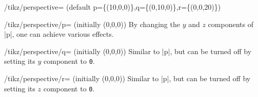 \begin{key}{/tikz/perspective=
    (default p=\{(10,0,0)\},q=\{(0,10,0)\},r=\{(0,0,20)\})}
\begin{key}{/tikz/perspective/p= (initially (0,0,0))}
    By changing the $y$ and $z$ components of |p|, one can achieve various
    effects.
\begin{codeexample}[]
\end{codeexample}
\begin{codeexample}[]
\end{codeexample}
\begin{codeexample}[]
\end{codeexample}
  \end{key}
  \begin{key}{/tikz/perspective/q= (initially (0,0,0))}
    Similar to |p|, but can be turned off by setting its $y$ component to 
    \texttt{0}.
\begin{codeexample}[]
\end{codeexample}
  \end{key}
  \begin{key}{/tikz/perspective/r= (initially (0,0,0))}
    Similar to |p|, but can be turned off by setting its $z$ component to 
    \texttt{0}.
\begin{codeexample}[]
\end{codeexample}
  \end{key}
\end{key}

